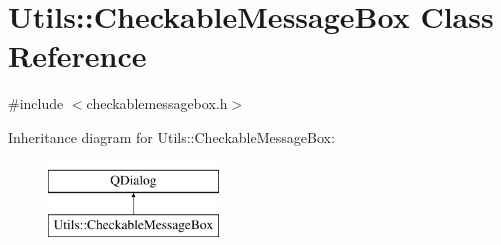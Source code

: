 \hypertarget{class_utils_1_1_checkable_message_box}{\section{Utils\-:\-:Checkable\-Message\-Box Class Reference}
\label{class_utils_1_1_checkable_message_box}
}


{\ttfamily \#include $<$checkablemessagebox.\-h$>$}

Inheritance diagram for Utils\-:\-:Checkable\-Message\-Box\-:\begin{figure}[H]
\begin{center}
\leavevmode
\includegraphics[height=2.000000cm]{class_utils_1_1_checkable_message_box}
\end{center}
\end{figure}

